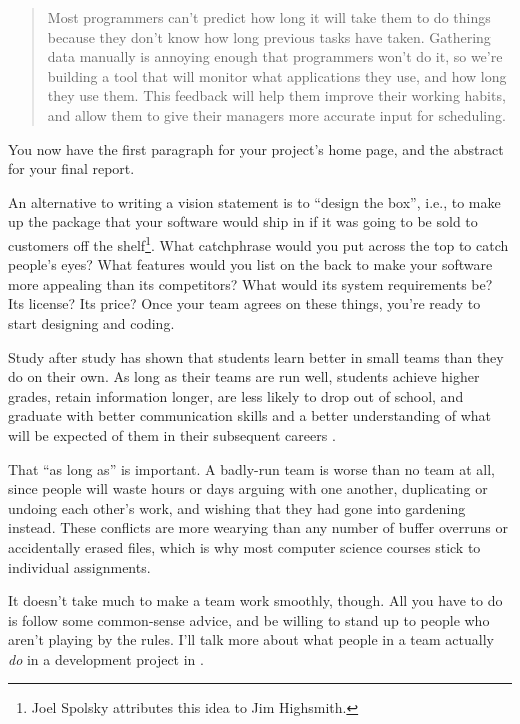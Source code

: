 \documentclass{report}
\begin{document}
\begin{quotation}

  Most programmers can't predict how long it will take them to do
  things because they don't know how long previous tasks have taken.
  Gathering data manually is annoying enough that programmers won't do
  it, so we're building a tool that will monitor what applications
  they use, and how long they use them.  This feedback will help them
  improve their working habits, and allow them to give their managers
  more accurate input for scheduling.

\end{quotation}

You now have the first paragraph for your project's home page, and the
abstract for your final report.

An alternative to writing a vision statement is to ``design the box'',
i.e., to make up the package that your software would ship in if it
was going to be sold to customers off the shelf\footnote{Joel Spolsky
attributes this idea to Jim Highsmith.}.  What catchphrase would you
put across the top to catch people's eyes?  What features would you
list on the back to make your software more appealing than its
competitors?  What would its system requirements be?  Its license?
Its price?  Once your team agrees on these things, you're ready to
start designing and coding.


Study after study has shown that students learn better in small teams
than they do on their own.  As long as their teams are run well,
students achieve higher grades, retain information longer, are less
likely to drop out of school, and graduate with better communication
skills and a better understanding of what will be expected of them in
their subsequent careers \cite{b:oakley-teams}.

That ``as long as'' is important.  A badly-run team is worse than no
team at all, since people will waste hours or days arguing with one
another, duplicating or undoing each other's work, and wishing that
they had gone into gardening instead.  These conflicts are more
wearying than any number of buffer overruns or accidentally erased
files, which is why most computer science courses stick to individual
assignments.

It doesn't take much to make a team work smoothly, though.  All you
have to do is follow some common-sense advice, and be willing to stand
up to people who aren't playing by the rules.  I'll talk more about
what people in a team actually \emph{do} in a development project in
.
\end{document}
